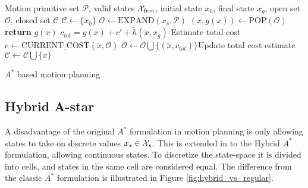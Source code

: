 \begin{algorithm}
    \begin{algorithmic}
        \Require Motion primitive set $\mathcal{P}$, valid states $\mathcal{X}_{\text{free}}$, initial state $x_0$, final state $x_g$, open set $\mathcal{O}$, closed set $\mathcal{C}$
            \State $\mathcal{C}\gets \{x_0\}$
            \State $\mathcal{O}\gets\text{EXPAND}(x_s, \mathcal{P})$
                \State $(x,g(x))\gets \text{POP}(\mathcal{O})$
                 
                    \State \textbf{return} $g(x)$
                \EndIf
                        \State $c_{tot}=g(x) + c' + \tilde{h}(\tilde{x}, x_{g})$ \Comment Estimate total cost
                        \State $c\gets\text{CURRENT\_COST}(\tilde{x}, \mathcal{O})$
                            \State $\mathcal{O}\gets\mathcal{O}\bigcup\{(\tilde{x},c_{tot})\}$\Comment Update total cost estimate
                        \EndIf
                    \EndIf
                \EndFor
            \State $\mathcal{C}\gets\mathcal{C}\bigcup \{x\}$
            \EndWhile
        \end{algorithmic}
        \caption{$A^*$ based motion planning}
        \label{alg:astar}
\end{algorithm}

\subsection{Hybrid A-star}\label{sec:hybrid-a-star}
A disadvantage of the original $A^*$ formulation in motion planning is only allowing states to take on discrete values $x_s\in\mathcal{X}_s$. This is extended in \cite{hybrid_astar} to the Hybrid $A^*$ formulation,
allowing continuous states. To discretize the state-space it is divided into cells, and states in the same cell are considered equal. The difference from the classic $A^*$ formulation is illustrated in 
Figure \ref{fig:hybrid_vs_regular}.

